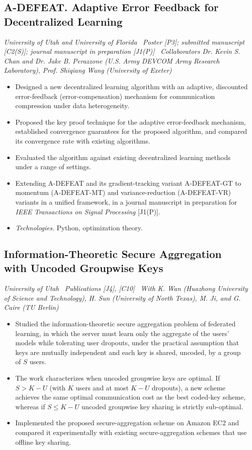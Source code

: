 \documentclass[10pt]{article}
\newcommand{\proj}[2]{\subsection*{#1}{\small\itshape #2}\par}
\newcommand{\tech}[1]{\item \textit{Technologies.} #1}
\begin{document}
\proj{A-DEFEAT. Adaptive Error Feedback for Decentralized Learning}{University of Utah and University of Florida \textbullet\ Poster [P3]; submitted manuscript [C2(S)]; journal manuscript in preparation [J1(P)] \textbullet\ Collaborators Dr. Kevin S. Chan and Dr. Jake B. Perazzone (U.S. Army DEVCOM Army Research Laboratory), Prof. Shiqiang Wang (University of Exeter)}
\begin{itemize}
\item Designed a new decentralized learning algorithm with an adaptive, discounted error-feedback (error-compensation) mechanism for communication compression under data heterogeneity.
\item Proposed the key proof technique for the adaptive error-feedback mechanism, established convergence guarantees for the proposed algorithm, and compared its convergence rate with existing algorithms.
\item Evaluated the algorithm against existing decentralized learning methods under a range of settings.
\item Extending A-DEFEAT and its gradient-tracking variant A-DEFEAT-GT to momentum (A-DEFEAT-MT) and variance-reduction (A-DEFEAT-VR) variants in a unified framework, in a journal manuscript in preparation for \emph{IEEE Transactions on Signal Processing} [J1(P)].
\tech{Python, optimization theory.}
\end{itemize}

\proj{Information-Theoretic Secure Aggregation with Uncoded Groupwise Keys}{University of Utah \textbullet\ Publications [J4], [C10] \textbullet\ With K. Wan (Huazhong University of Science and Technology), H. Sun (University of North Texas), M. Ji, and G. Caire (TU Berlin)}
\begin{itemize}
\item Studied the information-theoretic secure aggregation problem of federated learning, in which the server must learn only the aggregate of the users' models while tolerating user dropouts, under the practical assumption that keys are mutually independent and each key is shared, uncoded, by a group of $S$ users.
\item The work characterizes when uncoded groupwise keys are optimal. If $S > K-U$ (with $K$ users and at most $K-U$ dropouts), a new scheme achieves the same optimal communication cost as the best coded-key scheme, whereas if $S \le K-U$ uncoded groupwise key sharing is strictly sub-optimal.
\item Implemented the proposed secure-aggregation scheme on Amazon EC2 and compared it experimentally with existing secure-aggregation schemes that use offline key sharing.
\end{itemize}
\end{document}
